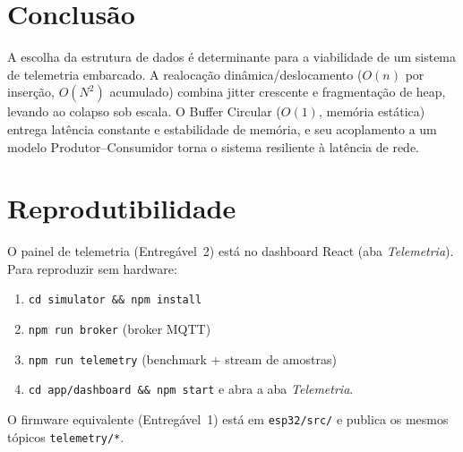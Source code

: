 \documentclass[11pt,a4paper]{article}
\begin{document}
\section{Conclusão}
A escolha da estrutura de dados é determinante para a viabilidade de um sistema
de telemetria embarcado. A realocação dinâmica/deslocamento ($O(n)$ por
inserção, $O(N^2)$ acumulado) combina jitter crescente e fragmentação de heap,
levando ao colapso sob escala. O Buffer Circular ($O(1)$, memória estática)
entrega latência constante e estabilidade de memória, e seu acoplamento a um
modelo Produtor--Consumidor torna o sistema resiliente à latência de rede.

\section*{Reprodutibilidade}
O painel de telemetria (Entregável~2) está no dashboard React (aba
\emph{Telemetria}). Para reproduzir sem hardware:
\begin{enumerate}
  \item \texttt{cd simulator \&\& npm install}
  \item \texttt{npm run broker} (broker MQTT)
  \item \texttt{npm run telemetry} (benchmark + stream de amostras)
  \item \texttt{cd app/dashboard \&\& npm start} e abra a aba \emph{Telemetria}.
\end{enumerate}
O firmware equivalente (Entregável~1) está em \texttt{esp32/src/} e publica os
mesmos tópicos \texttt{telemetry/*}.
\end{document}
